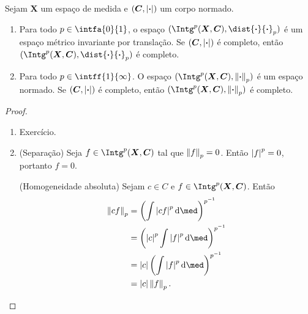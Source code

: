 \begin{prop}
Sejam $\bm X$ um espaço de medida e $(\bm C,\left\vert{\bm{\cdot}}\right\vert)$ um corpo normado.
	\begin{enumerate}
	\item Para todo $p \in \intfa{0}{1}$, o espaço $(\Intg^p(\bm X,\bm C),\dist{\var}{\var}_p)$ é um espaço métrico invariante por translação. Se $(\bm C,\left\vert{\bm{\cdot}}\right\vert)$ é completo, então $(\Intg^p(\bm X,\bm C),\dist{\var}{\var}_p)$ é completo.
	
	\item Para todo $p \in \intff{1}{\infty}$. O espaço $(\Intg^p(\bm X,\bm C),\nor{\var}_p)$ é um espaço normado. Se $(\bm C,\left\vert{\bm{\cdot}}\right\vert)$ é completo, então $(\Intg^p(\bm X,\bm C),\nor{\var}_p)$ é completo.
	\end{enumerate}
\end{prop}
\begin{proof}
	\begin{enumerate}
	\item Exercício.
	
	\item (Separação) Seja $f \in \Intg^p(\bm X,\bm C)$ tal que $\left\Vert{f}\right\Vert_p = 0$. Então $\left\vert{f}\right\vert^p = 0$, portanto $f=0$.
	
(Homogeneidade absoluta) Sejam $c \in C$ e $f \in \Intg^p(\bm X,\bm C)$. Então
		\begin{align*}
		\nor{cf}_p &= \left( \int \abs{cf}^p \dd\med \right)^{p\inv} \\
			&= \left( \abs{c}^p \int \abs{f}^p \dd\med \right)^{p\inv} \\
			&= \abs{c} \left( \int \abs{f}^p \dd\med \right)^{p\inv} \\
			&= \abs{c}\nor{f}_p.
		\end{align*}


\end{enumerate}
\end{proof}
